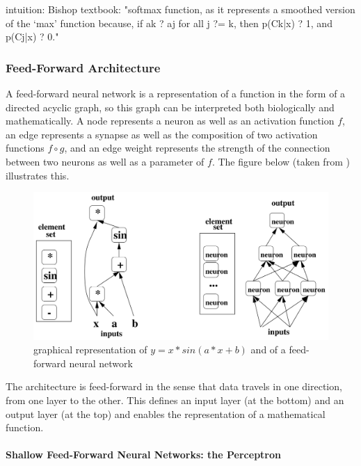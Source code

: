 \documentclass[a4paper,11pt]{article}
\begin{document}
intuition: Bishop textbook: "softmax function, as it represents
a smoothed version of the ‘max’ function because, if ak ? aj for all j ?= k, then p(Ck|x) ? 1, and p(Cj|x) ? 0."


\subsubsection{Feed-Forward Architecture}

A feed-forward neural network is a representation of a function in the form of a directed acyclic graph, so this graph can be interpreted both biologically and mathematically. A node represents a neuron as well as an activation function $f$, an edge represents a synapse as well as the composition of two activation functions $f \circ g$, and an edge weight represents the strength of the connection between two neurons as well as a parameter of $f$. The figure below (taken from \cite{DL-book}) illustrates this.

\begin{figure}[h!]
	\centering
	\includegraphics[scale=0.3]{images/NN_math_rep.png}
	\caption{graphical representation of $y = x*sin(a*x+b)$ and of a feed-forward neural network}
\end{figure}

The architecture is feed-forward in the sense that data travels in one direction, from one layer to the other. This defines an input layer (at the bottom) and an output layer (at the top) and enables the representation of a mathematical function.\\

\paragraph{Shallow Feed-Forward Neural Networks: the Perceptron}
\end{document}
